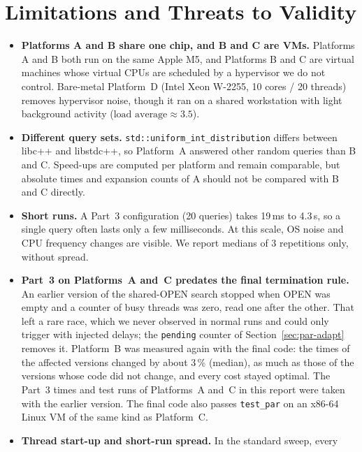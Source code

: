 \section{Limitations and Threats to Validity}
\label{sec:threats}

\begin{itemize}
  \item \textbf{Platforms A and B share one chip, and B and C are VMs.} Platforms A and
        B both run on the same Apple M5, and Platforms B and C are virtual
        machines whose virtual CPUs are scheduled by a hypervisor we do not
        control. Bare-metal Platform~D (Intel Xeon W-2255, 10 cores / 20 threads)
        removes hypervisor noise, though it ran on a shared workstation with light
        background activity ($\text{load average} \approx 3.5$).
  \item \textbf{Different query sets.} \texttt{std::\allowbreak uniform\_int\_\allowbreak distribution}
        differs between libc++ and libstdc++, so Platform~A answered other
        random queries than B and C. Speed-ups are computed per platform and
        remain comparable, but absolute times and expansion counts of A should
        not be compared with B and C directly.
  \item \textbf{Short runs.} A Part~3 configuration (20 queries) takes
        19\,ms to 4.3\,s, so a single query often lasts only a few
        milliseconds. At this scale, OS noise and CPU
        frequency changes are visible. We report medians of 3 repetitions
        only, without spread.
  \item \textbf{Part~3 on Platforms~A and~C predates the final termination
        rule.} An earlier version of the shared-OPEN search stopped when OPEN
        was empty and a counter of busy threads was zero, read one after the
        other. That left a rare race, which we never observed in normal runs
        and could only trigger with injected delays; the \texttt{pending}
        counter of Section~\ref{sec:par-adapt} removes it. Platform~B was
        measured again with the final code: the times of the affected versions
        changed by about 3\,\% (median), as much as those of the versions whose
        code did not change, and every cost stayed optimal. The Part~3 times
        and test runs of Platforms~A and~C in this report were taken with the
        earlier version. The final code also passes \texttt{test\_par} on an
        x86-64 Linux VM of the same kind as Platform~C.
  \item \textbf{Thread start-up and short-run spread.} In the standard sweep, every

\end{itemize}

